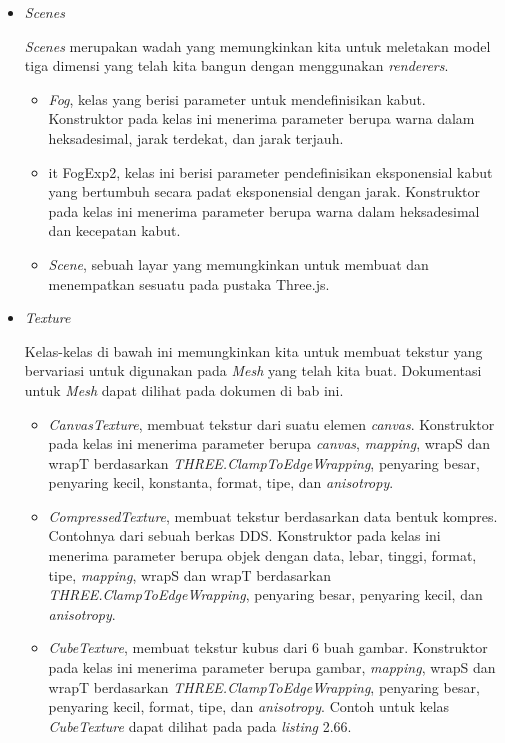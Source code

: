 \begin{itemize}
\item \textit{Scenes}

{\it Scenes} merupakan wadah yang memungkinkan kita untuk meletakan model tiga dimensi yang telah kita bangun dengan menggunakan {\it renderers}. 
	\begin{itemize}
	\item {\it Fog}, kelas yang berisi parameter untuk mendefinisikan kabut. Konstruktor pada kelas ini menerima parameter berupa warna dalam heksadesimal, jarak terdekat, dan jarak terjauh.
	
	\item {it FogExp2}, kelas ini berisi parameter pendefinisikan eksponensial kabut yang bertumbuh secara padat eksponensial dengan jarak. Konstruktor pada kelas ini menerima parameter berupa warna dalam heksadesimal dan kecepatan kabut.
	
	\item {\it Scene}, sebuah layar yang memungkinkan untuk membuat dan menempatkan sesuatu pada pustaka Three.js. 
	\end{itemize}
	
\item \textit{Texture}

Kelas-kelas di bawah ini memungkinkan kita untuk membuat tekstur yang bervariasi untuk digunakan pada {\it Mesh} yang telah kita buat. Dokumentasi untuk {\it Mesh} dapat dilihat pada dokumen di bab ini.
	\begin{itemize}
	\item{\it CanvasTexture}, membuat tekstur dari suatu elemen {\it canvas}. Konstruktor pada kelas ini menerima parameter berupa {\it canvas}, {\it mapping}, wrapS dan wrapT berdasarkan {\it THREE.ClampToEdgeWrapping}, penyaring besar, penyaring kecil, konstanta, format, tipe, dan {\it anisotropy}.
	\item{\it CompressedTexture}, membuat tekstur berdasarkan data bentuk kompres. Contohnya dari sebuah berkas DDS. Konstruktor pada kelas ini menerima parameter berupa objek dengan data, lebar, tinggi, format, tipe, {\it mapping}, wrapS dan wrapT berdasarkan {\it THREE.ClampToEdgeWrapping}, penyaring besar, penyaring kecil, dan {\it anisotropy}.
	\item{\it CubeTexture}, membuat tekstur kubus dari 6 buah gambar. Konstruktor pada kelas ini menerima parameter berupa gambar, {\it mapping},  wrapS dan wrapT berdasarkan {\it THREE.ClampToEdgeWrapping}, penyaring besar, penyaring kecil, format, tipe, dan {\it anisotropy}. Contoh untuk kelas {\it CubeTexture} dapat dilihat pada pada {\it listing} 2.66.
	

\end{itemize}
\end{itemize}
